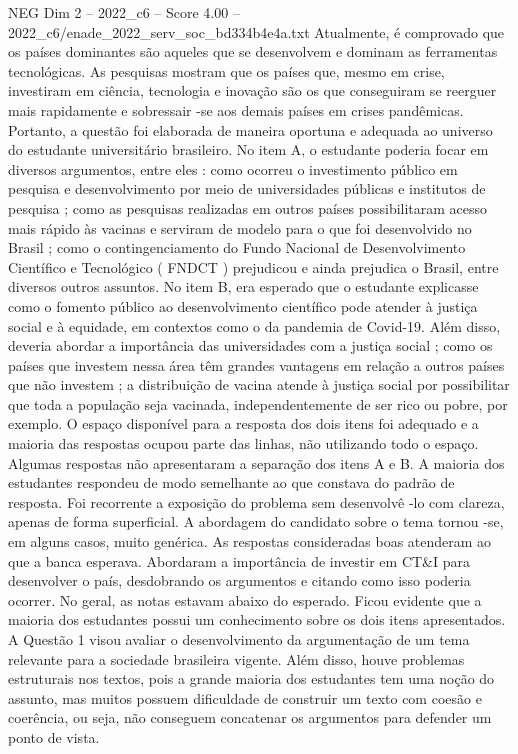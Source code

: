 \begin{textsample}{NEG Dim 2 – 2022\_c6 – Score 4.00 – 2022\_c6/enade\_2022\_serv\_soc\_bd334b4e4a.txt}
Atualmente, é comprovado que os países dominantes são aqueles que se desenvolvem e dominam as ferramentas tecnológicas.
As pesquisas mostram que os países que, mesmo em crise, investiram em ciência, tecnologia e inovação são os que conseguiram se reerguer mais rapidamente e sobressair -se aos demais países em crises pandêmicas.
Portanto, a questão foi elaborada de maneira oportuna e adequada ao universo do estudante universitário brasileiro.
No item A, o estudante poderia focar em diversos argumentos, entre eles : como ocorreu o investimento público em pesquisa e desenvolvimento por meio de universidades públicas e institutos de pesquisa ; como as pesquisas realizadas em outros países possibilitaram acesso mais rápido às vacinas e serviram de modelo para o que foi desenvolvido no Brasil ; como o contingenciamento do Fundo Nacional de Desenvolvimento Científico e Tecnológico ( FNDCT ) prejudicou e ainda prejudica o Brasil, entre diversos outros assuntos.
No item B, era esperado que o estudante explicasse como o fomento público ao desenvolvimento científico pode atender à justiça social e à equidade, em contextos como o da pandemia de Covid-19.
Além disso, deveria abordar a importância das universidades com a justiça social ; como os países que investem nessa área têm grandes vantagens em relação a outros países que não investem ; a distribuição de vacina atende à justiça social por possibilitar que toda a população seja vacinada, independentemente de ser rico ou pobre, por exemplo.
O espaço disponível para a resposta dos dois itens foi adequado e a maioria das respostas ocupou parte das linhas, não utilizando todo o espaço.
Algumas respostas não apresentaram a separação dos itens A e B.
A maioria dos estudantes respondeu de modo semelhante ao que constava do padrão de resposta.
Foi recorrente a exposição do problema sem desenvolvê -lo com clareza, apenas de forma superficial.
A abordagem do candidato sobre o tema tornou -se, em alguns casos, muito genérica.
As respostas consideradas boas atenderam ao que a banca esperava.
Abordaram a importância de investir em CT\&I para desenvolver o país, desdobrando os argumentos e citando como isso poderia ocorrer.
No geral, as notas estavam abaixo do esperado.
Ficou evidente que a maioria dos estudantes possui um conhecimento sobre os dois itens apresentados.
A Questão 1 visou avaliar o desenvolvimento da argumentação de um tema relevante para a sociedade brasileira vigente.
Além disso, houve problemas estruturais nos textos, pois a grande maioria dos estudantes tem uma noção do assunto, mas muitos possuem dificuldade de construir um texto com coesão e coerência, ou seja, não conseguem concatenar os argumentos para defender um ponto de vista.

\end{textsample}
